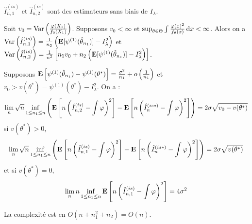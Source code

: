 	\begin{pop}
		$\hat{I}_{n,1}^{(is)}$ et $\hat{I}_{n,2}^{(is)}$ sont des estimateurs sans biais de $I_\lambda$.
	\end{pop}
	
	\begin{pop}
		Soit $v_0 = \operatorname{Var} \left( \frac{\varphi(X_1)}{f_0(X_1)} \right)$.
		Supposons $v_0 < \infty$ et $\sup_{\theta \in \Theta} \int \frac{\varphi(x)^2}{f_\theta(x)} \mathop{}\mathopen{}\mathrm{d} x < \infty$.
		Alors on a $\operatorname{Var} \left( \hat{I}_{n,1}^{(is)} \right) = \frac{1}{n_2} \left( \mathbf{E}[\psi^{(1)}(\hat{\theta}_{n_1})] - I_\lambda^2 \right)$ et $\operatorname{Var} \left( \hat{I}_{n,2}^{(is)} \right) = \frac{1}{n^2} \left[ n_1 v_0 + n_2 \left( \mathbf{E}[\psi^{(1)}(\hat{\theta}_{n_1})] - I_\lambda^2 \right) \right]$.
	\end{pop}
	
	\begin{pop}
		Supposons $\mathbf{E} \left[ \psi^{(1)}(\hat{\theta}_{n_1}) - \psi^{(1)}(\theta^*) \right] = \frac{\sigma^2}{n_1} + o \left( \frac{1}{n_1} \right)$ et $v_0 > v(\theta^*) = \psi^{(1)}(\theta^*) - I_\lambda^2$.
		On a :
		$$\lim_n \sqrt{n} \inf_{1 \leq n_1 \leq n} \left( \mathbf{E} \left[ n \left( \hat{I}_{n,2}^{(is)} - \int \varphi \right)^2 \right] - \mathbf{E} \left[ n \left( \hat{I}_{n}^{(is*)} - \int \varphi \right)^2 \right] \right) = 2 \sigma \sqrt{v_0 - v(\theta^*)}$$
		si $v(\theta^*) > 0$,
		$$\lim_n \sqrt{n} \inf_{1 \leq n_1 \leq n} \left( \mathbf{E} \left[ n \left( \hat{I}_{n,1}^{(is)} - \int \varphi \right)^2 \right] - \mathbf{E} \left[ n \left( \hat{I}_{n}^{(is*)} - \int \varphi \right)^2 \right] \right) = 2 \sigma \sqrt{v(\theta^*)}$$
		et si $v(\theta^*) = 0$,
		$$\lim_n n \inf_{1 \leq n_1 \leq n} \mathbf{E} \left[ n \left( \hat{I}_{n,1}^{(is)} - \int \varphi \right)^2 \right] = 4 \sigma^2$$
	\end{pop}
	
	La complexité est en $O(n + n_1^2 + n_2) = O(n)$.